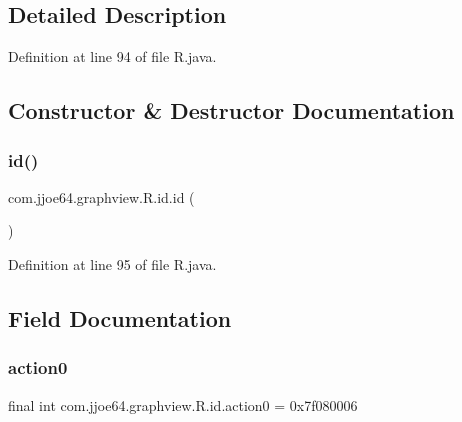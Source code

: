 \subsection{Detailed Description}


Definition at line 94 of file R.\+java.



\subsection{Constructor \& Destructor Documentation}
\mbox{\label{classcom_1_1jjoe64_1_1graphview_1_1_r_1_1id_a8f17eca8851fc4a446a195c4c056beb2}} 
\subsubsection{\texorpdfstring{id()}{id()}}
{\footnotesize\ttfamily com.\+jjoe64.\+graphview.\+R.\+id.\+id (\begin{DoxyParamCaption}{ }\end{DoxyParamCaption})\hspace{0.3cm}{\ttfamily [private]}}



Definition at line 95 of file R.\+java.


\begin{DoxyCode}{0}

\end{DoxyCode}


\subsection{Field Documentation}
\mbox{\label{classcom_1_1jjoe64_1_1graphview_1_1_r_1_1id_a41d8edc56dd76bf1b12003742775af48}} 
\subsubsection{\texorpdfstring{action0}{action0}}
{\footnotesize\ttfamily final int com.\+jjoe64.\+graphview.\+R.\+id.\+action0 = 0x7f080006\hspace{0.3cm}{\ttfamily [static]}}




